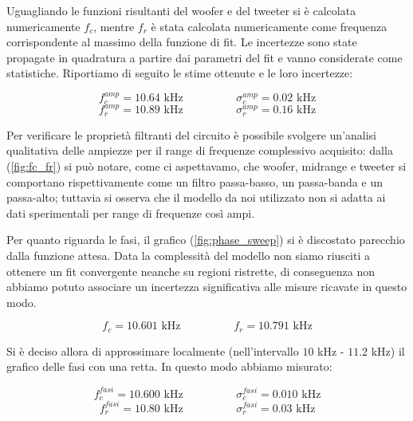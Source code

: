 \documentclass[12pt,italian]{article}
\begin{document}
Uguagliando le funzioni risultanti del woofer e del tweeter si è calcolata
numericamente $f_{c}$, mentre $f_{r}$ è stata calcolata numericamente come
frequenza corrispondente al massimo della funzione di fit. Le incertezze sono
state propagate in quadratura a partire dai parametri del fit e vanno
considerate come statistiche. Riportiamo di seguito le stime ottenute e le loro
incertezze:

\begin{equation*}
	f_{c}^{amp} = 10.64 \text{ kHz} \hspace{2cm} \sigma_c^{amp} = 0.02 \text{ kHz}
\end{equation*}
\begin{equation*}
	f_{r}^{amp} = 10.89 \text{ kHz} \hspace{2cm} \sigma_r^{amp} = 0.16 \text{ kHz}
\end{equation*}

Per verificare le proprietà filtranti del circuito è possibile svolgere
un'analisi qualitativa delle ampiezze per il range di frequenze complessivo
acquisito: dalla (\cref{fig:fc_fr}) si può notare, come ci aspettavamo, che
woofer, midrange e tweeter si comportano rispettivamente come un filtro
passa-basso, un passa-banda e un passa-alto; tuttavia si osserva che il modello
da noi utilizzato non si adatta ai dati sperimentali per range di frequenze
così ampi.

Per quanto riguarda le fasi, il grafico (\cref{fig:phase_sweep}) si è
discostato parecchio dalla funzione attesa. Data la complessità del modello non
siamo riusciti a ottenere un fit convergente neanche su regioni ristrette, di
conseguenza non abbiamo potuto associare un incertezza significativa alle
misure ricavate in questo modo.

\begin{equation*}
	f_{c} = 10.601 \text{ kHz} \hspace{2cm} f_{r} = 10.791 \text{ kHz}
\end{equation*}

Si è deciso allora di approssimare localmente (nell'intervallo $10$ kHz -
$11.2$ kHz) il grafico delle fasi con una retta. In questo modo abbiamo
misurato:

\begin{equation*}
	f_{c}^{fasi} = 10.600 \text{ kHz}  \hspace{2cm}  \sigma_c^{fasi} = 0.010 \text{ kHz}
\end{equation*}
\begin{equation*}
	f_{r}^{fasi} = 10.80 \text{ kHz}  \hspace{2cm}  \sigma_r^{fasi} = 0.03 \text{ kHz}
\end{equation*}
\end{document}
